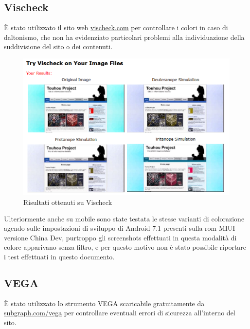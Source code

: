 \documentclass[openany, a4paper, 12pt]{report}
\begin{document}
			\subsection{Vischeck}
			\`{E} stato utilizzato il sito web \url{vischeck.com} per controllare i colori in caso di daltonismo, che non ha evidenziato particolari problemi alla individuazione della suddivisione del sito o dei contenuti.
			
			\begin{figure}[H]
				\centering
				\includegraphics[width=0.8\linewidth]{images/daltonismo}
				\caption{Risultati ottenuti su Vischeck}
			\end{figure}
			Ulteriormente anche su mobile sono state testata le stesse varianti di colorazione agendo sulle impostazioni di sviluppo di Android 7.1 presenti sulla rom MIUI versione China Dev, purtroppo gli screenshots effettuati in questa modalità di colore apparivano senza filtro, e per questo motivo non è stato possibile riportare i test effettuati in questo documento.
			
			\subsection{VEGA}
			\`{E} stato utilizzato lo strumento VEGA scaricabile gratuitamente da \url{subgraph.com/vega} per controllare eventuali errori di sicurezza all'interno del sito.\\
			
\end{document}
